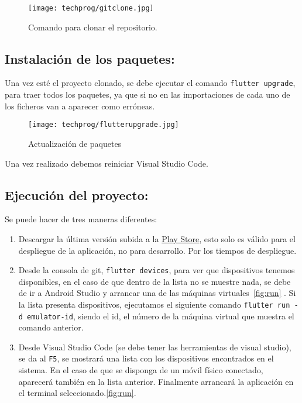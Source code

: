 \begin{figure}[H]
	\centering
	\texttt{[image: techprog/gitclone.jpg]}
	\caption{Comando para clonar el repositorio.}\label{fig:git-clone}
\end{figure}

\subsection{Instalación de los paquetes:}
Una vez esté el proyecto clonado, se debe ejecutar el comando \texttt{flutter upgrade}, para traer todos los paquetes, ya que si no en las importaciones de cada uno de los ficheros van a aparecer como erróneas.

\begin{figure}[H]
	\centering
	\texttt{[image: techprog/flutterupgrade.jpg]}
	\caption{Actualización de paquetes}\label{fig:upgrade}
\end{figure}

Una vez realizado debemos reiniciar Visual Studio Code.

\subsection{Ejecución del proyecto:}
Se puede hacer de tres maneras diferentes:

\begin{enumerate}
	\item Descargar la última versión subida a la \href{https://play.google.com/store/apps/details?id=com.ubu.flutter_snake}{Play Store}, esto solo es válido para el despliegue de la aplicación, no para desarrollo. Por los tiempos de despliegue.

	\item Desde la consola de git, \texttt{flutter devices}, para ver que dispositivos tenemos disponibles, en el caso de que dentro de la lista no se muestre nada, se debe de ir a Android Studio y arrancar una de las máquinas virtuales~\ref{fig:run} .
	Si la lista presenta dispositivos, ejecutamos el siguiente comando \texttt{flutter run -d emulator-id}, siendo el id, el número de la máquina virtual que muestra el comando anterior.
	
	\item Desde Visual Studio Code (se debe tener las herramientas de visual studio), se da al \texttt{F5}, se mostrará una lista con los dispositivos encontrados en el sistema. En el caso de que se disponga de un móvil físico conectado, aparecerá también en la lista anterior. Finalmente arrancará la aplicación en el terminal seleccionado.\ref{fig:run}.
\end{enumerate} 	

